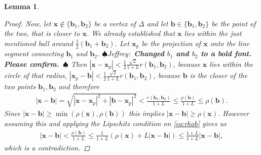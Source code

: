 \documentclass[preprint, 10pt]{elsarticle}
\newcommand{\vx}{{\mathbf x}}
\newcommand{\vb}{{\mathbf b}}
\newif\ifnotesw \noteswtrue
\newcommand{\jeffrey}[1]{\ifnotesw  \textcolor[rgb]{0,0,1}{  $\spadesuit$Jeffrey:\ {\sf \bf \it #1}\ $\spadesuit$ }\fi}
\newtheorem{lemma}[theorem]{Lemma}
\theoremstyle{definition}
\theoremstyle{remark}
\begin{document}
\begin{lemma}
\begin{proof}
		Now, let $\vx\notin \{\vb_1,\vb_2\}$ be a vertex of $\Delta$ and let $\vb\in\{\vb_1,\vb_2\}$ be the point of the two, that is closer to $\vx$. 
        We already established that $\vx$ lies within the just mentioned ball around $\frac{1}{2}(\vb_1+\vb_2)$.
		Let $\vx_p$ be the projection of $\vx$ onto the line segment connecting $\vb_1$ and $\vb_2$. \jeffrey{Changed $b_1$ and $b_2$ to a bold font. Please confirm.}
        Then $|\vx-\vx_p|< \frac{1}{2}{\frac{\sqrt{2}}{1+L}}r(\vb_1,\vb_2)$, 
        because $\vx$ lies within the circle of that radius, $|\vx_p-\vb|< \frac{1}{2}{\frac{\sqrt{2}}{1+L}}r(\vb_1,\vb_2)$, because $\vb$ is the closer of the two points ${\vb_1,\vb_2}$ and therefore  \begin{align}
		\label{eq:rhob}
		|\vx-\vb|=\sqrt{|\vx-\vx_p|^2+|\vb-\vx_p|^2}< \frac{r(\vb_1,\vb_2)}{1+L}\le \frac{\rho(\vb)}{1+L}\le \rho(\vb).\end{align}
		Since $|\vx-\vb|\ge \min(\rho(\vx),\rho(\vb))$ this implies $|\vx-\vb|\ge \rho(\vx)$.
		However assuming this and applying the Lipschitz condition on \eqref{eq:rhob} gives us 
		\begin{align*}
			|\vx-\vb| < \frac{\rho(\vb)}{1+L}\le \frac{1}{1+L}\left(\rho(\vx)+L|\vx-\vb|\right)\le \frac{1+L}{1+L}|\vx-\vb|,
		\end{align*}
		which is a contradiction.
		\end{proof}
\end{lemma}
\end{document}
